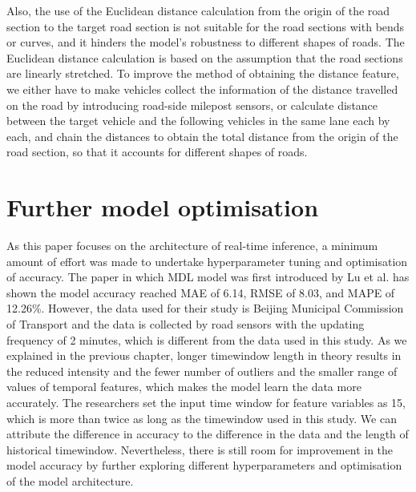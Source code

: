 \documentclass[11pt]{uonthesis}
\begin{document}
Also, the use of the Euclidean distance calculation from the origin of the road section to the target road section is not suitable for the road sections with bends or curves, and it hinders the model's robustness to different shapes of roads. The Euclidean distance calculation is based on the assumption that the road sections are linearly stretched. To improve the method of obtaining the distance feature, we either have to make vehicles collect the information of the distance travelled on the road by introducing road-side milepost sensors, or calculate distance between the target vehicle and the following vehicles in the same lane each by each, and chain the distances to obtain the total distance from the origin of the road section, so that it accounts for different shapes of roads.

\section{Further model optimisation}

As this paper focuses on the architecture of real-time inference, a minimum amount of effort was made to undertake hyperparameter tuning and optimisation of accuracy. The paper in which MDL model was first introduced by Lu et al. \cite{9284587} has shown the model accuracy reached MAE of 6.14, RMSE of 8.03, and MAPE of 12.26\%. However, the data used for their study is Beijing Municipal Commission of Transport and the data is collected by road sensors with the updating frequency of 2 minutes, which is different from the data used in this study. As we explained in the previous chapter, longer timewindow length in theory results in the reduced intensity and the fewer number of outliers and the smaller range of values of temporal features, which makes the model learn the data more accurately. The researchers set the input time window for feature variables as 15, which is more than twice as long as the timewindow used in this study. We can attribute the difference in accuracy to the difference in the data and the length of historical timewindow. Nevertheless, there is still room for improvement in the model accuracy by further exploring different hyperparameters and optimisation of the model architecture.
\end{document}
